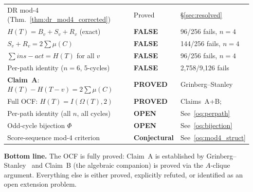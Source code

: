 \documentclass[12pt,reqno]{amsart}
\theoremstyle{plain}
\theoremstyle{definition}
\theoremstyle{remark}
\newcommand{\insact}{\mathrm{ins}_{\mathrm{act}}}
\renewcommand{\insact}{ins-act}%
\begin{document}
\begin{center}
\begin{tabular}{p{6.8cm} l p{3.2cm}}
DR mod-4 (Thm.~\ref{thm:dr_mod4_corrected}) & Proved & \S\ref{sec:resolved}\\
$H(T)=B_v+S_v+R_v$ (exact) & \textcolor{axisred}{\textbf{FALSE}} & 96/256 fails, $n=4$\\
$S_v+R_v = 2\sum\mu(C)$ & \textcolor{axisred}{\textbf{FALSE}} & 144/256 fails, $n=4$\\
$\sum\insact = H(T)$ for all $v$ & \textcolor{axisred}{\textbf{FALSE}} & 96/256 fails, $n=4$\\
Per-path identity ($n=6$, 5-cycles) & \textcolor{axisred}{\textbf{FALSE}} & 2,758/9,126 fails\\
\midrule
\textbf{Claim~A}: $H(T)-H(T{-}v) = 2\sum\mu(C)$ & \textcolor{resolvedgreen}{\textbf{PROVED}} & Grinberg--Stanley~\cite{grinberg2024}\\
Full OCF: $H(T) = I(\Omega(T), 2)$ & \textcolor{resolvedgreen}{\textbf{PROVED}} & Claims~A+B; \cite{grinberg2024}\\
Per-path identity (all $n$, all cycles) & \textcolor{openred}{\textbf{OPEN}} & See~\ref{oq:perpath}\\
Odd-cycle bijection $\Phi$ & \textcolor{openred}{\textbf{OPEN}} & See~\ref{oq:bijection}\\
Score-sequence mod-4 criterion & \textcolor{orange!70!black}{\textbf{Conjectural}} & See~\ref{oq:mod4_struct}\\
\bottomrule
\end{tabular}
\end{center}

\noindent\textbf{Bottom line.} The OCF is fully proved: Claim~A is established
by Grinberg--Stanley~\cite{grinberg2024} and Claim~B (the algebraic companion)
is proved via the $A$-clique argument. Everything else is either proved,
explicitly refuted, or identified as an open extension problem.
\end{document}
